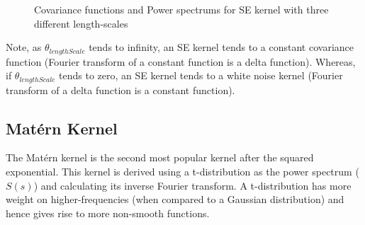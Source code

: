 \begin{figure}[!ht]
  \centering
    \quad
{}\quad
\caption{Covariance functions and Power spectrums for SE kernel with three different length-scales}
       \label{figKernelAndPowerSpectrumsSE}
\end{figure}

Note, as $\theta_{lengthScale}$ tends to infinity, an SE kernel tends to a constant covariance function (Fourier transform of a constant function is a delta function). Whereas, if $\theta_{lengthScale}$ tends to zero, an SE kernel tends to a white noise kernel (Fourier transform of a delta function is a constant function).

\subsection{Mat\'ern Kernel}\label{subsecCh4MaternKernel}
The Mat\'ern kernel is the second most popular kernel after the squared exponential. This kernel is derived using a t-distribution as the power spectrum ($S(s)$) and calculating its inverse Fourier transform. A t-distribution has more weight on higher-frequencies (when compared to a Gaussian distribution) and hence gives rise to more non-smooth functions. 

